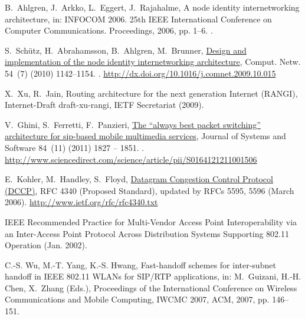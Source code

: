 \documentclass[preprint,12pt]{elsarticle}
\begin{document}
\begin{thebibliography}{10}
B.~Ahlgren, J.~Arkko, L.~Eggert, J.~Rajahalme, A node identity internetworking
  architecture, in: INFOCOM 2006. 25th IEEE International Conference on
  Computer Communications. Proceedings, 2006, pp. 1--6.
\newblock \href {http://dx.doi.org/10.1109/INFOCOM.2006.51}
  {}.

S.~Sch\"{u}tz, H.~Abrahamsson, B.~Ahlgren, M.~Brunner,
  \href{http://dx.doi.org/10.1016/j.comnet.2009.10.015}{Design and
  implementation of the node identity internetworking architecture}, Comput.
  Netw. 54~(7) (2010) 1142--1154.
\newblock \href {http://dx.doi.org/10.1016/j.comnet.2009.10.015}
  {}.
\newline\urlprefix\url{http://dx.doi.org/10.1016/j.comnet.2009.10.015}

X.~Xu, R.~Jain, {Routing architecture for the next generation Internet
  (RANGI)}, {Internet-Draft} draft-xu-rangi, {IETF Secretariat} (2009).

V.~Ghini, S.~Ferretti, F.~Panzieri,
  \href{http://www.sciencedirect.com/science/article/pii/S0164121211001506}{The
  “always best packet switching” architecture for sip-based mobile
  multimedia services}, Journal of Systems and Software 84~(11) (2011) 1827 --
  1851.
\newblock \href {http://dx.doi.org/10.1016/j.jss.2011.06.025}
  {}.
\newline\urlprefix\url{http://www.sciencedirect.com/science/article/pii/S0164121211001506}

E.~Kohler, M.~Handley, S.~Floyd,
  \href{http://www.ietf.org/rfc/rfc4340.txt}{{Datagram Congestion Control
  Protocol (DCCP)}}, RFC 4340 (Proposed Standard), updated by RFCs 5595, 5596
  (March 2006).
\newline\urlprefix\url{http://www.ietf.org/rfc/rfc4340.txt}

{IEEE Recommended Practice for Multi-Vendor Access Point Interoperability via
  an Inter-Access Point Protocol Across Distribution Systems Supporting 802.11
  Operation} (Jan. 2002).

C.-S. Wu, M.-T. Yang, K.-S. Hwang, {Fast-handoff schemes for inter-subnet
  handoff in IEEE 802.11 WLANs for SIP/RTP applications}, in: M.~Guizani, H.-H.
  Chen, X.~Zhang (Eds.), Proceedings of the International Conference on
  Wireless Communications and Mobile Computing, IWCMC 2007, ACM, 2007, pp.
  146--151.


\end{thebibliography}
\end{document}
